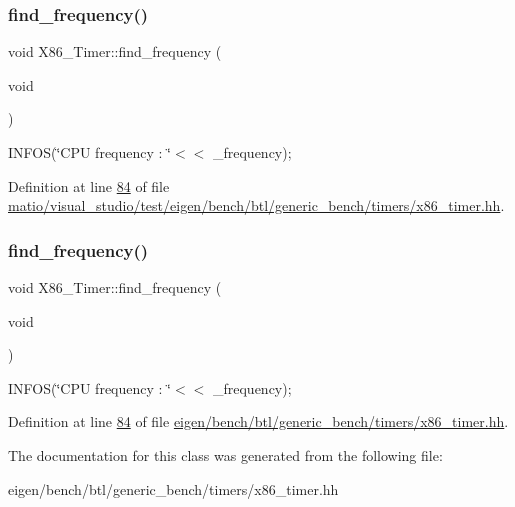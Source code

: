 \subsubsection{\texorpdfstring{find\+\_\+frequency()}{find\_frequency()}\hspace{0.1cm}{\footnotesize\ttfamily [1/2]}}
{\footnotesize\ttfamily void X86\+\_\+\+Timer\+::find\+\_\+frequency (\begin{DoxyParamCaption}\item[{void}]{ }\end{DoxyParamCaption})\hspace{0.3cm}{\ttfamily [inline]}}

I\+N\+F\+OS(\char`\"{}\+C\+P\+U frequency \+: \char`\"{}$<$$<$ \+\_\+frequency); 

Definition at line \hyperlink{matio_2visual__studio_2test_2eigen_2bench_2btl_2generic__bench_2timers_2x86__timer_8hh_source_l00084}{84} of file \hyperlink{matio_2visual__studio_2test_2eigen_2bench_2btl_2generic__bench_2timers_2x86__timer_8hh_source}{matio/visual\+\_\+studio/test/eigen/bench/btl/generic\+\_\+bench/timers/x86\+\_\+timer.\+hh}.

\mbox{\label{class_x86___timer_a1beddd8cb10ed89d3dd06d3b233b63e1}} 
\subsubsection{\texorpdfstring{find\+\_\+frequency()}{find\_frequency()}\hspace{0.1cm}{\footnotesize\ttfamily [2/2]}}
{\footnotesize\ttfamily void X86\+\_\+\+Timer\+::find\+\_\+frequency (\begin{DoxyParamCaption}\item[{void}]{ }\end{DoxyParamCaption})\hspace{0.3cm}{\ttfamily [inline]}}

I\+N\+F\+OS(\char`\"{}\+C\+P\+U frequency \+: \char`\"{}$<$$<$ \+\_\+frequency); 

Definition at line \hyperlink{eigen_2bench_2btl_2generic__bench_2timers_2x86__timer_8hh_source_l00084}{84} of file \hyperlink{eigen_2bench_2btl_2generic__bench_2timers_2x86__timer_8hh_source}{eigen/bench/btl/generic\+\_\+bench/timers/x86\+\_\+timer.\+hh}.



The documentation for this class was generated from the following file\+:\begin{DoxyCompactItemize}
\item 
eigen/bench/btl/generic\+\_\+bench/timers/x86\+\_\+timer.\+hh\end{DoxyCompactItemize}
